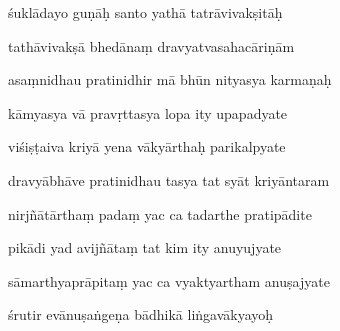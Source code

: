 \documentclass[article,12pt,a4paper]{memoir}%
\newcounter{parCount}
\begin{document}
	  
	  \pstart {} śuklādayo guṇāḥ santo yathā tatrāvivakṣitāḥ 
	{}
	\pend%
      

	  
	  \pstart \leavevmode%
	tathāvivakṣā bhedānaṃ dravyatvasahacāriṇām 
	{}
	\pend%
      

	  
	  \pstart {} asaṃnidhau pratinidhir mā bhūn nityasya karmaṇaḥ 
	{}
	\pend%
      

	  
	  \pstart \leavevmode%
	kāmyasya vā pravṛttasya lopa ity upapadyate 
	{}
	\pend%
      

	  
	  \pstart {} viśiṣṭaiva kriyā yena vākyārthaḥ parikalpyate 
	{}
	\pend%
      

	  
	  \pstart \leavevmode%
	dravyābhāve pratinidhau tasya tat syāt kriyāntaram 
	{}
	\pend%
      

	  
	  \pstart {} nirjñātārthaṃ padaṃ yac ca tadarthe pratipādite 
	{}
	\pend%
      

	  
	  \pstart \leavevmode%
	pikādi yad avijñātaṃ tat kim ity anuyujyate 
	{}
	\pend%
      

	  
	  \pstart {} sāmarthyaprāpitaṃ yac ca vyaktyartham anuṣajyate 
	{}
	\pend%
      

	  
	  \pstart \leavevmode%
	śrutir evānuṣaṅgeṇa bādhikā liṅgavākyayoḥ 
	{}
	\pend%
      
\end{document}
